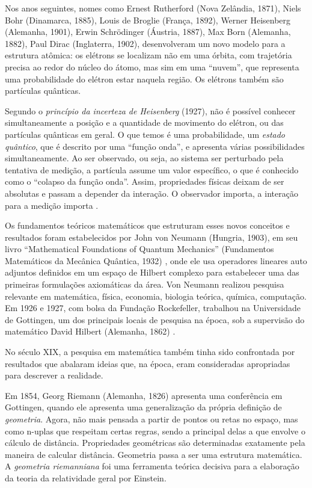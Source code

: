 \documentclass{hipatia}
\begin{document}
Nos anos seguintes, nomes como Ernest Rutherford (Nova Zelândia, 1871), Niels Bohr (Dinamarca, 1885), Louis de Broglie (França, 1892), Werner Heisenberg (Alemanha, 1901), Erwin Schrödinger (Áustria, 1887), Max Born (Alemanha, 1882), Paul Dirac (Inglaterra, 1902), desenvolveram um novo modelo para a estrutura atômica: os elétrons se localizam não em uma órbita, com trajetória precisa ao redor do núcleo do átomo, mas sim em uma ``nuvem'', que representa uma probabilidade do elétron estar naquela região. Os elétrons também são partículas quânticas.

Segundo o \textit{princípio da incerteza de Heisenberg} (1927), não é possível conhecer simultaneamente a posição e a quantidade de movimento do elétron, ou das partículas quânticas em geral. O que temos é uma probabilidade, um \textit{estado quântico}, que é descrito por uma ``função onda'', e apresenta várias possibilidades simultaneamente. Ao ser observado, ou seja, ao sistema ser perturbado pela tentativa de medição, a partícula assume um valor específico, o que é conhecido como o ``colapso da função onda''. Assim, propriedades físicas deixam de ser absolutas e passam a depender da interação. O observador importa, a interação para a medição importa \cite{Heisenberg1958}.

Os fundamentos teóricos matemáticos que estruturam esses novos conceitos e resultados foram estabelecidos por John von Neumann (Hungria, 1903), em seu livro ``Mathematical Foundations of Quantum Mechanics'' (Fundamentos Matemáticos da Mecânica Quântica, 1932) \cite{VonNeumann1955}, onde ele usa operadores lineares auto adjuntos definidos em um espaço de Hilbert complexo para estabelecer uma das primeiras formulações axiomáticas da área. Von Neumann realizou pesquisa relevante em matemática, física, economia, biologia teórica, química, computação. Em 1926 e 1927, com bolsa da Fundação Rockefeller, trabalhou na Universidade de Gottingen, um dos principais locais de pesquisa na época, sob a supervisão do matemático David Hilbert (Alemanha, 1862) \cite{Macrae1992}.

No século XIX, a pesquisa em matemática também tinha sido confrontada por resultados que abalaram ideias que, na época, eram consideradas apropriadas para descrever a realidade.

Em 1854, Georg Riemann (Alemanha, 1826) apresenta uma conferência em Gottingen,  quando ele apresenta uma generalização da própria definição de \textit{geometria}. Agora, não mais pensada a partir de pontos ou retas no espaço, mas como n-uplas que respeitam certas regras, sendo a principal delas a que envolve o cálculo de distância. Propriedades geométricas são determinadas exatamente pela maneira de calcular distância. Geometria passa a ser uma estrutura matemática. A \textit{geometria riemanniana} foi uma ferramenta teórica decisiva para a elaboração da teoria da relatividade geral por Einstein.
\end{document}
